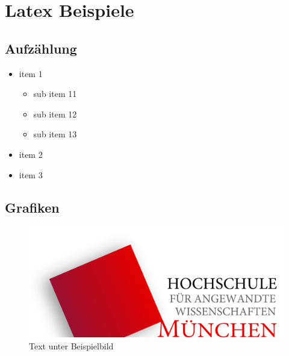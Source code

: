 \chapter{Latex Beispiele} \label{hdl:konstrukte}
\section{Aufzählung} \label{hdl:konstrukte_aufzaehlung}
\begin{itemize}
	\item item 1
	\begin{itemize}
		\item sub item 11
		\item sub item 12
		\item sub item 13
	\end{itemize}
	\item item 2
	\item item 3
\end{itemize}
\clearpage

\section{Grafiken} \label{hdl:konstrukte_grafiken}
\begin{figure}[H]
\begin{center}
    \includegraphics[width=1.0\textwidth]{figures/hm_logo_svg.pdf}
	\caption[Kurzeintrag Verzeichnis Beispielbild]{Text unter Beispielbild} \label{fig:beispielbild}
\end{center}
\end{figure}

